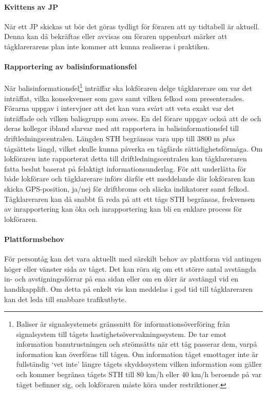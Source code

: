\paragraph{Kvittens av JP}
När ett JP skickas ut bör det göras tydligt för föraren att ny tidtabell är aktuell.
Denna kan då bekräftas eller avvisas om föraren uppenbart märker att tågklarerarens plan inte kommer att kunna realiseras i praktiken.
\paragraph{Rapportering av balisinformationsfel}
När balisinformationsfel\footnote{Baliser är signalsystemets gränssnitt för informationsöverföring från signalsystem till tågets hastighetsövervakningssystem. De tar emot information banutrustningen och strömsätts när ett tåg passerar dem, varpå information kan överföras till tågen. Om information tåget emottager inte är fullständig \lq{}vet inte\rq{} längre tågets skyddssystem vilken information som gäller och kommer begränsa tågets STH till 80 km/h eller 40 km/h beroende på var tåget befinner sig, och lokföraren måste köra under restriktioner\cite{TTJ2015}.} inträffar ska lokföraren delge tågklarerare om var det inträffat, vilka konsekvenser som gavs samt vilken felkod som presenterades.
Förarna uppgav i intervjuer att det kan vara svårt att veta exakt var det inträffade och vilken balisgrupp som avses.
En del förare uppgav också att de och deras kollegor ibland slarvar med att rapportera in balisinformationsfel till driftledningscentralen.
Längden STH begränsas vara upp till 3800 m \emph{plus} tågsättets längd, vilket skulle kunna påverka en tågfärds rättidighetsförmåga.
Om lokföraren inte rapporterat detta till driftledningscentralen kan tågklareraren fatta beslut baserat på felaktigt informationsunderlag.
För att underlätta för både lokförare och tågklarerare införs därför ett meddelande där lokföraren kan skicka GPS-position, ja/nej för driftbroms och släcka indikatorer samt felkod.
Tågklareraren kan då snabbt få reda på att ett tågs STH begränsas, frekvensen av inrapportering kan öka och inrapportering kan bli en enklare process för lokföraren.
\paragraph{Plattformsbehov}
För persontåg kan det vara aktuellt med särskilt behov av plattform vid antingen höger eller vänster sida av tåget.
Det kan röra sig om ett större antal avstängda in- och avstigningsdörrar på ena sidan eller om en dörr är avstängd vid en handikapplift.
Om detta på enkelt vis kan meddelas i god tid till tågklareraren kan det leda till snabbare trafikutbyte.
